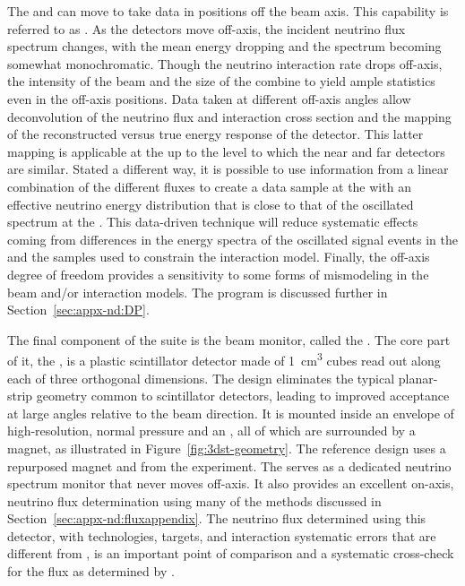The  and  can move to take data in positions off the beam axis.  This capability is referred to as . As the detectors move off-axis, the incident neutrino flux spectrum changes, with the mean energy dropping and the spectrum becoming somewhat monochromatic.  Though the neutrino interaction rate drops off-axis, the intensity of the beam and the size of the   combine to yield ample statistics even in the off-axis positions. 
Data taken at different off-axis angles allow deconvolution of the neutrino flux and interaction cross section and the mapping of the reconstructed versus true energy response of the detector.  This latter mapping is applicable at the  up to the level to which the near and far  detectors are similar.  Stated a different way, it is possible to use information from a linear combination of the different fluxes to create a data sample at the  with an effective neutrino energy distribution that is close to that of the oscillated spectrum at the .  This data-driven technique will reduce systematic effects coming from differences in the energy spectra of the oscillated signal events in the  and the  samples used to constrain the interaction model. Finally, the off-axis degree of freedom provides a sensitivity to some forms of mismodeling in the beam and/or interaction models. The  program is discussed further in Section~\ref{sec:appx-nd:DP}.

The final component of the   suite is the beam monitor, called the .  The core part of it, the , is a plastic scintillator detector made of \SI{1}{\cubic\centi\meter} cubes read out along each of three orthogonal dimensions.  The design eliminates the typical planar-strip geometry common to scintillator detectors, leading to improved acceptance at large angles relative to the beam direction. It is mounted  
inside an envelope of high-resolution, normal pressure  and an , all 
of which are surrounded by a magnet, as illustrated in Figure~\ref{fig:3dst-geometry}.  The reference design uses a repurposed magnet and  from the  experiment.
The  serves as a dedicated neutrino spectrum monitor that never moves off-axis. %
It also provides an excellent on-axis, neutrino flux determination using many of the methods discussed in Section~\ref{sec:appx-nd:fluxappendix}. 
The neutrino flux determined using this detector, with  %
technologies, targets, and interaction systematic errors that are different from , is an important point of comparison and a systematic cross-check for the flux as determined by .


